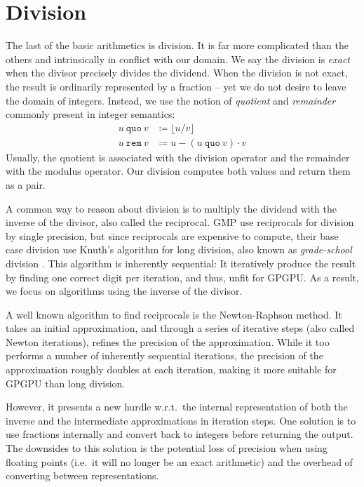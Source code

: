 \section{Division}
\label{sec:div}

The last of the basic arithmetics is division. It is far more complicated than
the others and intrinsically in conflict with our domain. We say the division is
\textit{exact} when the divisor precisely divides the dividend. When the
division is not exact, the result is ordinarily represented by a fraction -- yet
we do not desire to leave the domain of integers. Instead, we use the notion of
\textit{quotient} and \textit{remainder} commonly present in integer semantics:
\begin{align}
  u~\mathtt{quo}~v &\coloneq \lfloor u/v \rfloor\\
  u~ \mathtt{rem}~v &\coloneq u - \left( u~\mathtt{quo}~v \right)\cdot v
\end{align}
Usually, the quotient is associated with the division operator and the remainder
with the modulus operator. Our division computes both values and return them as
a pair.

A common way to reason about division is to multiply the dividend with the
inverse of the divisor, also called the reciprocal. GMP use reciprocals for
division by single precision, but since reciprocals are expensive to compute,
their base case division use Knuth's algorithm for long division, also known as
\textit{grade-school} division \cite{GMP, knuth97}. This algorithm is inherently
sequential: It iteratively produce the result by finding one correct digit per
iteration, and thus, unfit for GPGPU. As a result, we focus on algorithms using
the inverse of the divisor.

A well known algorithm to find reciprocals is the Newton-Raphson method. It
takes an initial approximation, and through a series of iterative steps (also
called Newton iterations), refines the precision of the approximation. While it
too performs a number of inherently sequential iterations, the precision of the
approximation roughly doubles at each iteration, making it more suitable for
GPGPU than long division.

However, it presents a new hurdle w.r.t.\ the internal representation of both
the inverse and the intermediate approximations in iteration steps. One solution
is to use fractions internally and convert back to integers before returning the
output. The downsides to this solution is the potential loss of precision when
using floating points (i.e.\ it will no longer be an exact arithmetic) and the
overhead of converting between representations.

